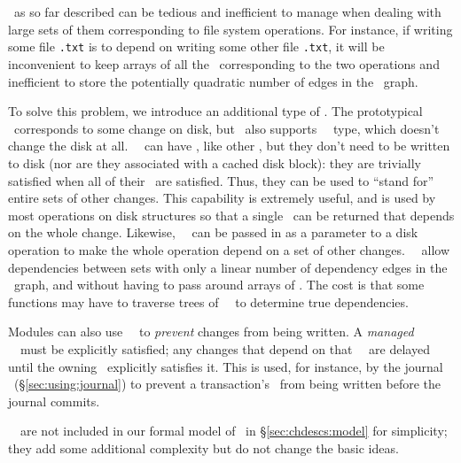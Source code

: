 \subsection{\Noop\ \ChDescs}
\label{sec:chdescs:noop}
\Chdescs\ as so far described can be tedious and inefficient to manage when
dealing with large sets of them corresponding to file system operations. For
instance, if writing some file \texttt{\after.txt} is to depend on writing some
other file \texttt{\before.txt}, it will be inconvenient to keep arrays of all
the \chdescs\ corresponding to the two operations and inefficient to store the
potentially quadratic number of edges in the \chdesc\ graph.

To solve this problem, we introduce an additional type of \chdesc. The
prototypical \chdesc\ corresponds to some change on disk, but \Kudos\ also
supports \aemphnoop\ \chdesc\ type, which doesn't change the disk at all.
\Noop\ \chdescs\ can have \befores, like other \chdescs, but they don't need to
be written to disk (nor are they associated with a cached disk block): they are
trivially satisfied when all of their \befores\ are satisfied. Thus, they can be
used to ``stand for'' entire sets of other changes.
%
This capability is extremely useful, and is used by most operations on disk
structures so that a single \chdesc\ can be returned that depends on the whole
change. Likewise, \anoop\ \chdesc\ can be passed in as a parameter to a disk
operation to make the whole operation depend on a set of other changes. \Noop\
\chdescs\ allow dependencies between sets with only a linear number of
dependency edges in the \chdesc\ graph, and without having to pass around arrays
of \chdescs.
%
The cost is that some functions may have to traverse trees of \noop\ \chdescs\
to determine true dependencies.

Modules can also use \noop\ \chdescs\ to \emph{prevent} changes from being
written. A \emph{managed} \noop\ \chdesc\ must be explicitly satisfied; any
changes that depend on that \noop\ \chdesc\ are delayed until the owning \module\
explicitly satisfies it. This is used, for instance, by the journal \module\
(\S\ref{sec:using:journal}) to prevent a transaction's \chdescs\ from
being written before the journal commits.

\Noop\ \chdescs\ are not included in our formal model of \chdescs\ in
\S\ref{sec:chdescs:model} for simplicity; they add some additional complexity
but do not change the basic ideas.
